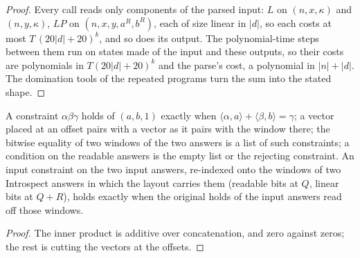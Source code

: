\begin{proof}
\leanok
Every call reads only components of the parsed input: $L$ on $(n, x, \kappa)$ and $(n, y,
\kappa)$, $LP$ on $(n, x, y, a^R, b^R)$, each of size linear in $|d|$, so each costs at most
$T\,(20|d| + 20)^k$, and so does its output. The polynomial-time steps between them run on states
made of the input and these outputs, so their costs are polynomials in $T(20|d|+20)^k$ and the
parse's cost, a polynomial in $|n| + |d|$. The domination tools of the repeated programs turn
the sum into the stated shape.
\end{proof}

\begin{lemma}
\label{lem:intro-forms}
\leanok
A constraint $\alpha \beta \gamma$ holds of $(a, b, 1)$ exactly when $\langle \alpha, a\rangle +
\langle \beta, b\rangle = \gamma$; a vector placed at an offset pairs with a vector as it pairs
with the window there; the bitwise equality of two windows of the two answers is a list of such
constraints; a condition on the readable answers is the empty list or the rejecting constraint.
An input constraint on the two input answers, re-indexed onto the windows of two Introspect
answers in which the layout carries them (readable bits at $Q$, linear bits at $Q + R$), holds
exactly when the original holds of the input answers read off those windows.
\end{lemma}

\begin{proof}
\leanok
The inner product is additive over concatenation, and zero against zeros; the rest is cutting
the vectors at the offsets.
\end{proof}

